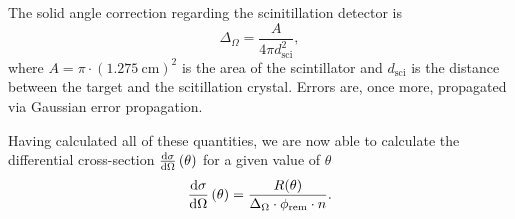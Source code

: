 The solid angle correction regarding the scinitillation detector is
\begin{equation*}
	\Delta_\Omega = \frac{A}{4\pi d_\text{sci}^2},
\end{equation*}
where $A=\pi\cdot\left(\SI{1.275}{\cm}\right)^2$ is the area of the scintillator and $d_\text{sci}$ is the distance between the target and the scitillation crystal.
Errors are, once more, propagated via Gaussian error propagation.

Having calculated all of these quantities, we are now able to calculate the differential cross-section $\frac{\text{d}\sigma}{\text{d}\Omega}\left(\theta\right)$ for a given value of $\theta$
\begin{equation*}
	\frac{\text{d}\sigma}{\text{d}\Omega}\left(\theta\right) = \frac{R(\theta)}{\Delta_\Omega\cdot\phi_\text{rem}\cdot n}.
\end{equation*}
